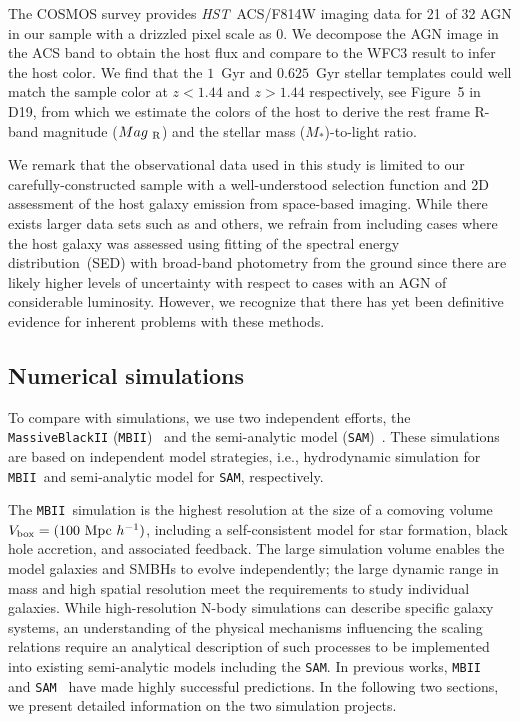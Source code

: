 \documentclass[twocolumn,trackchanges]{aastex63}
\newcommand{\hst}{{\it HST}}
\newcommand{\mr}{$Mag_{\rm ~R}$}
\newcommand{\mstar}{{$M_*$}}
\newcommand{\sam}{\texttt{SAM}}
\newcommand{\mbii}{\texttt{MBII}}
\begin{document}
The COSMOS survey provides \hst\ ACS/F814W imaging data for 21 of 32 AGN in our sample with a drizzled pixel scale as 0. We decompose the AGN image in the ACS band to obtain the host flux and compare to the WFC3 result to infer the host color. We find that the $1$~Gyr and $0.625$~Gyr stellar templates could well match the sample color at $z<1.44$ and $z>1.44$ respectively, see Figure~5 in D19, from which we estimate the colors of the host to derive the rest frame R-band magnitude (\mr) and the stellar mass (\mstar)-to-light ratio.

We remark that the observational data used in this study is limited to our carefully-constructed sample with a well-understood selection function and 2D assessment of the host galaxy emission from space-based imaging. While there exists larger data sets such as \citet{Sun2015} and others, we refrain from including cases where the host galaxy was assessed using fitting of the spectral energy distribution~(SED) with broad-band photometry from the ground since there are likely higher levels of uncertainty with respect to cases with an AGN of considerable luminosity. However, we recognize that there has yet been definitive evidence for inherent problems with these methods.

\subsection{Numerical simulations}\label{sample_sim}
To compare with simulations, we use two independent efforts, the \texttt{MassiveBlackII} (\texttt{MBII})~\citep{Khandai2015} and the semi-analytic model (\texttt{SAM})~\citep{Menci2014}. These simulations are based on independent model strategies, i.e., hydrodynamic simulation for \mbii\ and semi-analytic model for \sam, respectively.

The \mbii\ simulation is the highest resolution at the size of a comoving volume $V_{\rm box} = (100~{\rm Mpc}~h^{-1})$, including a self-consistent model for star formation, black hole accretion, and associated feedback. The large simulation volume enables the model galaxies and SMBHs to evolve independently; the large dynamic range in mass and high spatial resolution meet the requirements to study individual galaxies. While high-resolution N-body simulations can describe specific galaxy systems, an understanding of the physical mechanisms influencing the scaling relations require an analytical description of such processes to be implemented into existing semi-analytic models including the \sam. In previous works, \mbii~\citep{Huang2018, DeG++15, Khandai2015,Bhowmick2019} and \sam~\citep{Menci2014, Menci2016} have made highly successful predictions. In the following two sections, we present detailed information on the two simulation projects.
\end{document}
